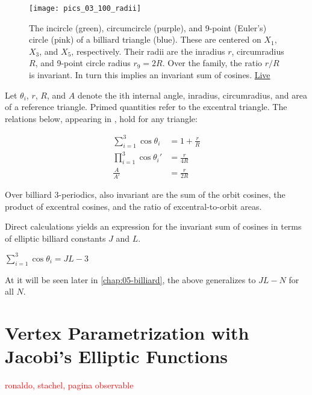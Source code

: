 \begin{figure}
    \centering
    \texttt{[image: pics\_03\_100\_radii]}
    \caption{The incircle (green), circumcircle (purple), and 9-point (Euler's) circle (pink) of a billiard triangle (blue). These are centered on $X_1$, $X_3$, and $X_5$, respectively. Their radii are the inradius $r$, circumradius $R$, and 9-point circle radius $r_9=2R$. Over the family, the ratio $r/R$ is invariant. In turn this implies an invariant sum of cosines. \href{https://bit.ly/337hvpf}{Live}}
    \label{fig:radii}
\end{figure}

Let $\theta_i$, $r$, $R$, and $A$ denote the ith internal angle, inradius, circumradius, and area of a reference triangle. Primed quantities refer to the excentral triangle. The relations below, appearing in  \cite{johnson1960},  hold for any triangle:

\begin{align}
\sum_{i=1}^{3}{\cos\theta_i}&=1+\frac{r}{R} \label{eqn:03-sum-cos} \\
\prod_{i=1}^{3}{\cos\theta_i'}&=\frac{r}{4R} \label{eqn:03-exc-prod-cos} \\
\frac{A}{A'}&=\frac{r}{2R} \label{eqn:03-area-ratio}
\end{align}

\begin{corollary}
Over billiard 3-periodics, also invariant are the sum of the orbit cosines, the product of excentral cosines, and the ratio of excentral-to-orbit areas.
\label{cor:03-rOvR}
\end{corollary}

Direct calculations yields an expression for the invariant sum of cosines in terms of elliptic billiard constants $J$ and $L$.

\begin{corollary}
$\sum_{i=1}^{3}{\cos\theta_i}=J L - 3$
\end{corollary}

At it will be seen later in \cref{chap:05-billiard}, the above generalizes to $J L -N$ for all $N$.

\section{Vertex Parametrization with Jacobi's Elliptic Functions}
 
 

\textcolor{red}{ronaldo, stachel, pagina observable}

